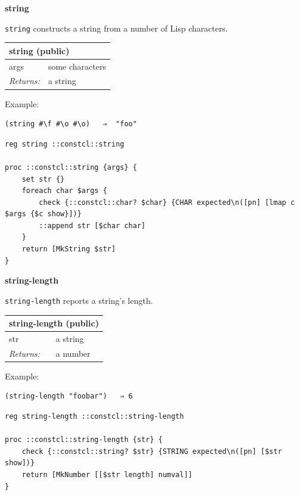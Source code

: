 \documentclass[twoside,9pt]{report}
\begin{document}
\textbf{string}


\texttt{string} constructs a string from a number of Lisp characters.

\begin{tabular}{ |l l| }
\hline
\multicolumn{2}{|l|}{string (public)} \\
\hline
args & some characters \\
\textit{Returns:} & a string \\
\hline
\end{tabular}


Example:

\noindent\makebox[\linewidth]{\rule{\linewidth}{0.4pt}}
\begin{lstlisting}
(string #\f #\o #\o)   ⇒  "foo"
\end{lstlisting}
\noindent\makebox[\linewidth]{\rule{\linewidth}{0.4pt}}
\noindent\makebox[\linewidth]{\rule{\linewidth}{0.4pt}}
\begin{lstlisting}
reg string ::constcl::string
 
proc ::constcl::string {args} {
    set str {}
    foreach char $args {
        check {::constcl::char? $char} {CHAR expected\n([pn] [lmap c $args {$c show}])}
        ::append str [$char char]
    }
    return [MkString $str]
}
\end{lstlisting}
\noindent\makebox[\linewidth]{\rule{\linewidth}{0.4pt}}

\textbf{string-length}


\texttt{string-length} reports a string's length.

\begin{tabular}{ |l l| }
\hline
\multicolumn{2}{|l|}{string-length (public)} \\
\hline
str & a string \\
\textit{Returns:} & a number \\
\hline
\end{tabular}


Example:

\noindent\makebox[\linewidth]{\rule{\linewidth}{0.4pt}}
\begin{lstlisting}
(string-length "foobar")   ⇒ 6
\end{lstlisting}
\noindent\makebox[\linewidth]{\rule{\linewidth}{0.4pt}}
\noindent\makebox[\linewidth]{\rule{\linewidth}{0.4pt}}
\begin{lstlisting}
reg string-length ::constcl::string-length
 
proc ::constcl::string-length {str} {
    check {::constcl::string? $str} {STRING expected\n([pn] [$str show])}
    return [MkNumber [[$str length] numval]]
}
\end{lstlisting}
\noindent\makebox[\linewidth]{\rule{\linewidth}{0.4pt}}
\end{document}
